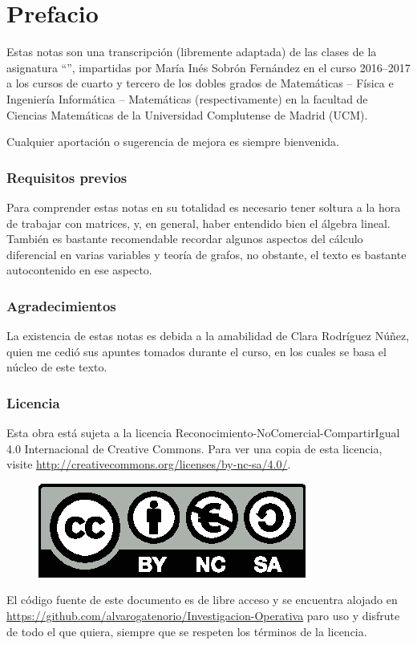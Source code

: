 \chapter*{Prefacio}
Estas notas son una transcripción (libremente adaptada) de las clases de la asignatura ``'', impartidas por María Inés Sobrón Fernández en el curso 2016--2017 a los cursos de cuarto y tercero de los dobles grados de  Matemáticas -- Física e Ingeniería Informática -- Matemáticas (respectivamente) en la facultad de Ciencias Matemáticas de la Universidad Complutense de Madrid (UCM).

Cualquier aportación o sugerencia de mejora es siempre bienvenida.
\subsection*{Requisitos previos}
Para comprender estas notas en su totalidad es necesario tener soltura a la hora de trabajar con matrices, y, en general, haber entendido bien el álgebra lineal. También es bastante recomendable recordar algunos aspectos del cálculo diferencial en varias variables y teoría de grafos, no obstante, el texto es bastante autocontenido en ese aspecto.
\subsection*{Agradecimientos}
La existencia de estas notas es debida a la amabilidad de Clara Rodríguez Núñez, quien me cedió sus apuntes tomados durante el curso, en los cuales se basa el núcleo de este texto.
\subsection*{Licencia}
Esta obra está sujeta a la licencia Reconocimiento-NoComercial-CompartirIgual 4.0 Internacional de Creative Commons. Para ver una copia de esta licencia, visite \url{http://creativecommons.org/licenses/by-nc-sa/4.0/}.
\begin{figure}[h]
	\centering
	\includegraphics[scale=1]{img/licencia}
\end{figure}

El código fuente de este documento es de libre acceso y se encuentra alojado en \url{https://github.com/alvarogatenorio/Investigacion-Operativa} paro uso y disfrute de todo el que quiera, siempre que se respeten los términos de la licencia.